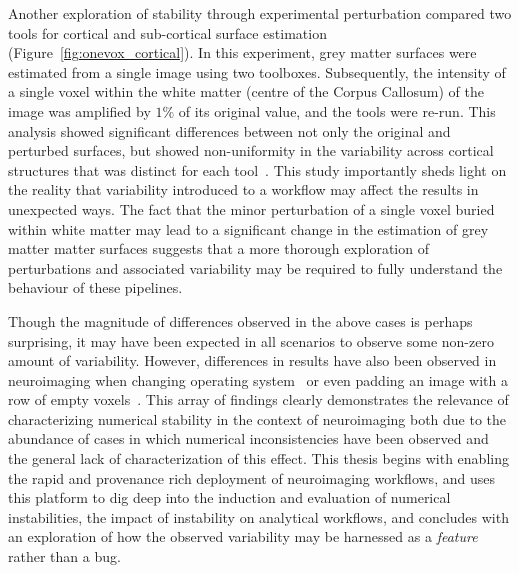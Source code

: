 Another exploration of stability through experimental perturbation compared two tools for cortical and sub-cortical
surface estimation~\cite{Lewis2017-ll} (Figure~\ref{fig:onevox_cortical}). In this experiment, grey matter surfaces were estimated from a single image using
two toolboxes. Subsequently, the intensity of a single voxel within the white matter (centre of the Corpus Callosum) of
the image was amplified by $1\%$ of its original value, and the tools were re-run. This analysis showed significant
differences between not only the original and perturbed surfaces, but showed non-uniformity in the variability across
cortical structures that was distinct for each tool~\cite{Lewis2017-ll}. This study importantly sheds light on the reality
that variability introduced to a workflow may affect the results in unexpected ways. The fact that the minor perturbation
of a single voxel buried within white matter may lead to a significant change in the estimation of grey matter matter
surfaces suggests that a more thorough exploration of perturbations and associated variability may be required to fully
understand the behaviour of these pipelines.

Though the magnitude of differences observed in the above cases is perhaps surprising, it may have been expected in all
scenarios to observe some non-zero amount of variability. However, differences in results have also been observed
in neuroimaging when changing operating system~\cite{Glatard2015-vc,salari2020file} or even padding an image with a row
of empty voxels~\cite{Glen2018-sg}. This array of findings clearly demonstrates the relevance of characterizing numerical
stability in the context of neuroimaging both due to the abundance of cases in which numerical inconsistencies have been
observed and the general lack of characterization of this effect. This thesis begins with enabling the rapid and
provenance rich deployment of neuroimaging workflows, and uses this platform to dig deep into the induction and
evaluation of numerical instabilities, the impact of instability on analytical workflows, and concludes with an
exploration of how the observed variability may be harnessed as a \textit{feature} rather than a bug.

